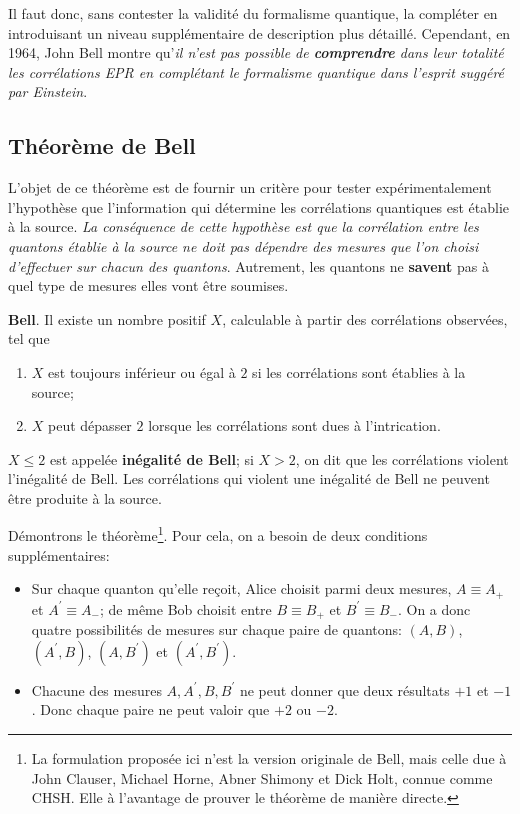 Il faut donc, sans contester la validité du formalisme quantique, la compléter
en introduisant un niveau supplémentaire de description plus détaillé.
Cependant, en 1964, John Bell montre qu'\emph{il n'est pas possible de
\textbf{comprendre} dans leur totalité les corrélations EPR en complétant le
formalisme quantique dans l'esprit suggéré par Einstein}.


\subsection{Théorème de Bell}

L'objet de ce théorème est de fournir un critère pour tester expérimentalement
l'hypothèse que l'information qui détermine les corrélations quantiques est
établie à la source. \emph{La conséquence de cette hypothèse est que la
corrélation entre les quantons établie à la source ne doit pas dépendre des
mesures que l'on choisi d'effectuer sur chacun des quantons}. Autrement, les
quantons ne \textbf{savent} pas à quel type de mesures elles vont être soumises.

\medskip\colorbox[gray]{0.8}{
\parbox[c]{0.9\textwidth}{
\begin{theorem}
\textbf{Bell}. Il existe un nombre positif $X$, calculable à partir des
corrélations observées, tel que

\begin{enumerate}
\item $X$ est toujours inférieur ou égal à $2$ si les corrélations sont établies
à la source;

\item $X$ peut dépasser $2$ lorsque les corrélations sont dues à l'intrication.
\end{enumerate}

$X\leq2$ est appelée \textbf{inégalité de Bell}; si $X>2$, on dit que les
corrélations violent l'inégalité de Bell. Les corrélations qui violent une
inégalité de Bell ne peuvent être produite à la source.
\end{theorem}
}}

Démontrons le théorème\footnote{La formulation proposée ici n'est la version
originale de Bell, mais celle due à John Clauser, Michael Horne, Abner Shimony
et Dick Holt, connue comme CHSH. Elle à l'avantage de prouver le théorème de
manière directe.}. Pour cela, on a besoin de deux conditions supplémentaires:
\begin{itemize}
\item Sur chaque quanton qu'elle reçoit, Alice choisit parmi deux mesures,
$A\equiv A_{+}$ et $A^{\prime}\equiv A_{-}$; de même Bob choisit entre $B\equiv
B_{+}$ et $B^{\prime}\equiv B_{-}$. On a donc quatre possibilités de mesures sur
chaque paire de quantons: $(A,B)$, $(A^{\prime},B)$, $(A,B^{\prime})$ et
$(A^{\prime},B^{\prime})$.

\item Chacune des mesures $A,A^{\prime},B,B^{\prime}$ ne peut donner que deux
résultats $+1$ et $-1$. Donc chaque paire ne peut valoir que $+2$ ou $-2$.
\end{itemize}

